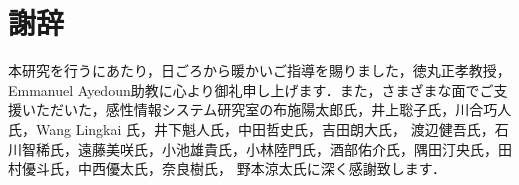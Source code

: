 \chapter*{謝辞}

本研究を行うにあたり，日ごろから暖かいご指導を賜りました，徳丸正孝教授，Emmanuel Ayedoun助教に心より御礼申し上げます．また，さまざまな面でご支援いただいた，感性情報システム研究室の布施陽太郎氏，井上聡子氏，川合巧人氏，Wang Lingkai 氏，井下魁人氏，中田哲史氏，吉田朗大氏，
渡辺健吾氏，石川智稀氏，遠藤美咲氏，小池雄貴氏，小林陸門氏，酒部佑介氏，隅田汀央氏，田村優斗氏，中西優太氏，奈良樹氏， 
野本涼太氏に深く感謝致します．

